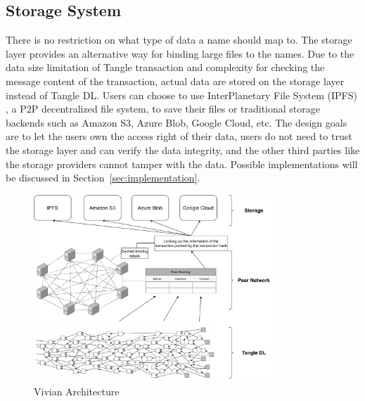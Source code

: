 \subsection{Storage System}
There is no restriction on what type of data a name should map to. The storage layer provides an alternative way for binding large files to the names.
Due to the data size limitation of Tangle transaction and complexity for checking the message content of the transaction, actual data are stored on the storage layer instead of Tangle DL.
Users can choose to use InterPlanetary File System (IPFS) \cite{benet2014ipfs}, a P2P decentralized file system, to save their files or traditional storage backends such as Amazon S3, Azure Blob, Google Cloud, etc.
The design goals are to let the users own the access right of their data, users do not need to trust the storage layer and can verify the data integrity, and the other third parties like the storage providers cannot tamper with the data.
Possible implementations will be discussed in Section~\ref{sec:implementation}.

\begin{figure}[h]
    \centering
    \includegraphics[width=0.8\textwidth,trim={0 0 0 0},clip]{figs/vivian_architecture.pdf}
    \caption{Vivian Architecture}
    \label{fig:vivian_architecture}
\end{figure}
